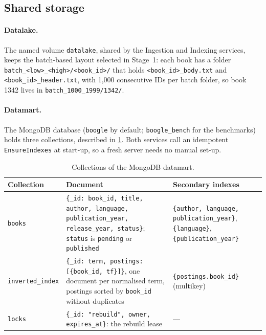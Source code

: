 \documentclass[10pt,a4paper]{article}
\newcommand{\code}[1]{\texttt{#1}}
\begin{document}
\subsection{Shared storage}
\label{sec:storage}

\paragraph{Datalake.}
The named volume \code{datalake}, shared by the Ingestion and Indexing
services, keeps the batch-based layout selected in Stage~1: each book has a
folder \code{batch\_<low>\_<high>/\allowbreak<book\_id>/} that holds
\code{<book\_id>\_body.txt} and \code{<book\_id>\_header.txt}, with 1{,}000
consecutive IDs per batch folder, so book 1342 lives in
\code{batch\_1000\_1999/1342/}.

\paragraph{Datamart.}
The MongoDB database (\code{boogle} by default; \code{boogle\_bench} for the
benchmarks) holds three collections, described in \cref{tab:collections}. Both
services call an idempotent \code{EnsureIndexes} at start-up, so a fresh server
needs no manual set-up.

\begin{table}[htbp]
  \centering
  \small
  \caption{Collections of the MongoDB datamart.}
  \label{tab:collections}
  \begin{tabularx}{\textwidth}{@{}l>{\raggedright\arraybackslash}X>{\raggedright\arraybackslash}p{4.6cm}@{}}
    \toprule
    Collection & Document & Secondary indexes \\
    \midrule
    \code{books} & \code{\{\_id: book\_id, title, author, language,
      publication\_year, release\_year, status\}}; \code{status} is
      \code{pending} or \code{published} & \code{\{author, language,
      publication\_year\}}, \code{\{language\}}, \code{\{publication\_year\}} \\
    \code{inverted\_index} & \code{\{\_id: term, postings: [\{book\_id, tf\}]\}},
      one document per normalised term, postings sorted by \code{book\_id}
      without duplicates & \code{\{postings.book\_id\}} (multikey) \\
    \code{locks} & \code{\{\_id: "rebuild", owner, expires\_at\}}: the rebuild
      lease & --- \\
    \bottomrule
  \end{tabularx}
\end{table}
\end{document}
